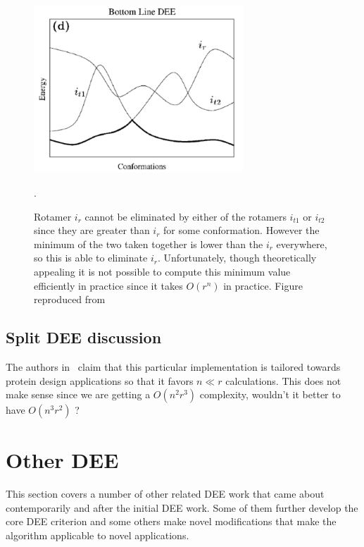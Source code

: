 \documentclass{article}
\begin{document}
\begin{figure}[h!]
    \centering
    \includegraphics[width=0.7\textwidth]{pics/bottom.pdf}
    \caption{Rotamer $i_r$ cannot be eliminated by either of the rotamers $i_{t1}$ or $i_{t2}$ since they are greater than $i_r$ for some conformation. However the minimum of the two taken together is lower than the $i_r$ everywhere, so this is able to eliminate $i_r$. Unfortunately, though theoretically appealing it is not possible to compute this minimum value efficiently in practice since it takes $O(r^n)$ in practice. Figure reproduced from~\cite{Pierce2000}}.
    \label{fig:bottomDEE}
\end{figure}

\pagebreak

\subsection*{Split DEE discussion}
The authors in~\cite{Pierce2000} claim that this particular implementation is tailored towards protein design applications so that it favors $n \ll r$ calculations. This does not make sense since we are getting a $O(n^2r^3)$ complexity, wouldn't it better to have $O(n^3r^2)$ ?


\section{Other DEE}
This section covers a number of other related DEE work that came about contemporarily and after the initial DEE work. Some of them further develop the core DEE criterion and some others make novel modifications that make the algorithm applicable to novel applications. 
\end{document}
